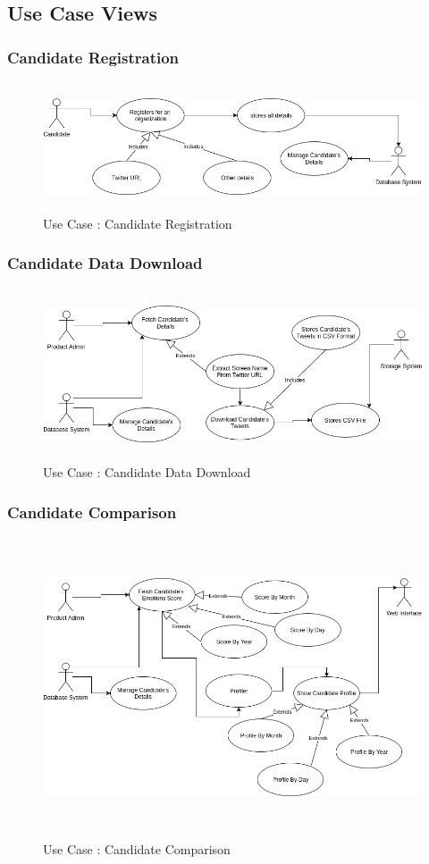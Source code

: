 \documentclass[oneside,a4paper,12pt]{pictreport}
\begin{document}
\subsection{Use Case Views}
\subsubsection{Candidate Registration}
\begin{figure}[h!]
\includegraphics[width=5.2in,height=1.5in]{UseCase1.jpg}
\caption{Use Case : Candidate Registration}
\end{figure}
\subsubsection{Candidate Data Download}
\begin{figure}[h!]
\includegraphics[width=5.2in,height=2.0in]{UseCase2.jpg}
\caption{Use Case : Candidate Data Download}
\end{figure}
\newpage
\subsubsection{Candidate Comparison}
\begin{figure}[h!]
\includegraphics[width=5.2in,height=3.5in]{UseCase3.jpg}
\caption{Use Case : Candidate Comparison}
\end{figure}
\end{document}
